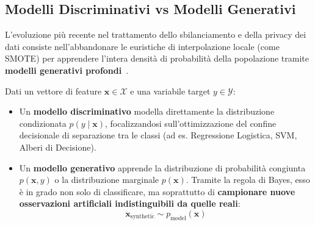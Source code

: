 \FloatBarrier
\subsection{Modelli Discriminativi vs Modelli Generativi}
\label{subsec:dm-disc-vs-gen}

L'evoluzione più recente nel trattamento dello sbilanciamento e della privacy dei dati consiste nell'abbandonare le euristiche di interpolazione locale (come SMOTE) per apprendere l'intera densità di probabilità della popolazione tramite \textbf{modelli generativi profondi}~\cite{mannocci2026imbalanced}.

\begin{definition}
Dati un vettore di feature $\mathbf{x} \in \mathcal{X}$ e una variabile target $y \in \mathcal{Y}$:
\begin{itemize}
    \item Un \textbf{modello discriminativo} modella direttamente la distribuzione condizionata $p(y \mid \mathbf{x})$, focalizzandosi sull'ottimizzazione del confine decisionale di separazione tra le classi (ad es. Regressione Logistica, SVM, Alberi di Decisione).
    \item Un \textbf{modello generativo} apprende la distribuzione di probabilità congiunta $p(\mathbf{x}, y)$ o la distribuzione marginale $p(\mathbf{x})$. Tramite la regola di Bayes, esso è in grado non solo di classificare, ma soprattutto di \textbf{campionare nuove osservazioni artificiali indistinguibili da quelle reali}:
    \begin{equation}
        \mathbf{x}_{\text{synthetic}} \sim p_{\text{model}}(\mathbf{x})
    \end{equation}
\end{itemize}
\end{definition}

\begin{table}[H]
\centering
\caption{Evoluzione paradigmatica dei metodi di sovracampionamento e generazione sintetica.}
\label{tab:dm-gen-evolution}
\vspace{2mm}
\end{table}

